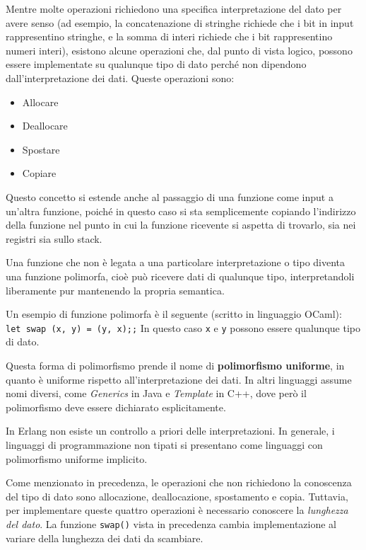 \documentclass{article}
\begin{document}
Mentre molte operazioni richiedono una specifica interpretazione del dato per avere senso (ad esempio, la concatenazione di stringhe richiede che i bit in input rappresentino stringhe, e la somma di interi richiede che i bit rappresentino numeri interi), esistono alcune operazioni che, dal punto di vista logico, possono essere implementate su qualunque tipo di dato perché non dipendono dall'interpretazione dei dati. Queste operazioni sono:
\begin{itemize}
    \item Allocare
    \item Deallocare
    \item Spostare
    \item Copiare\vspace{8pt}
\end{itemize}
Questo concetto si estende anche al passaggio di una funzione come input a un'altra funzione, poiché in questo caso si sta semplicemente copiando l'indirizzo della funzione nel punto in cui la funzione ricevente si aspetta di trovarlo, sia nei registri sia sullo stack.

Una funzione che non è legata a una particolare interpretazione o tipo diventa una funzione polimorfa, cioè può ricevere dati di qualunque tipo, interpretandoli liberamente pur mantenendo la propria semantica.

Un esempio di funzione polimorfa è il seguente (scritto in linguaggio OCaml):\\
\texttt{let swap (x, y) = (y, x);;} In questo caso \texttt{x} e \texttt{y} possono essere qualunque tipo di dato.

Questa forma di polimorfismo prende il nome di \textbf{polimorfismo uniforme}, in quanto è uniforme rispetto all'interpretazione dei dati. In altri linguaggi assume nomi diversi, come \textit{Generics} in Java e \textit{Template} in C++, dove però il polimorfismo deve essere dichiarato esplicitamente.

In Erlang non esiste un controllo a priori delle interpretazioni. In generale, i linguaggi di programmazione non tipati si presentano come linguaggi con polimorfismo uniforme implicito.

Come menzionato in precedenza, le operazioni che non richiedono la conoscenza del tipo di dato sono allocazione, deallocazione, spostamento e copia. Tuttavia, per implementare queste quattro operazioni è necessario conoscere la \textit{lunghezza del dato}. La funzione \texttt{swap()} vista in precedenza cambia implementazione al variare della lunghezza dei dati da scambiare.
\end{document}
